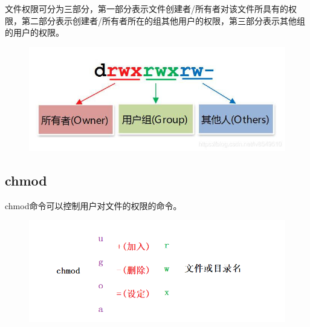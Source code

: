 \documentclass[12pt, openany, oneside]{book}
\begin{document}
文件权限可分为三部分，第一部分表示文件创建者/所有者对该文件所具有的权限，第二部分表示创建者/所有者所在的组其他用户的权限，第三部分表示其他组的用户的权限。 \\

\begin{table}[H]
	\centering
	\caption{文件权限}
\end{table}

\begin{figure}[H]
	\centering
	\includegraphics[scale=0.7]{img/C5/5-2/2.png}
\end{figure}

\subsection{chmod}

chmod命令可以控制用户对文件的权限的命令。

\begin{figure}[H]
	\centering
	\includegraphics[scale=0.6]{img/C5/5-2/3.png}
\end{figure}
\end{document}
